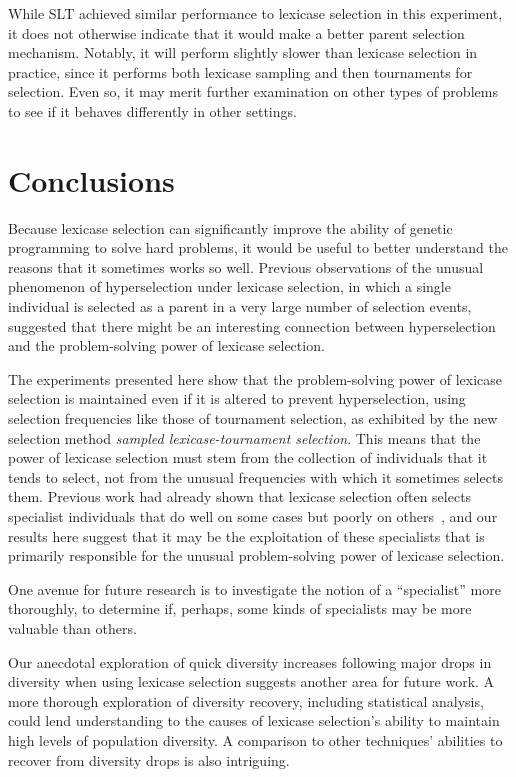 \documentclass{sig-alternate}
\begin{document}
While SLT achieved similar performance to lexicase selection in this experiment, it does not otherwise indicate that it would make a better parent selection mechanism. Notably, it will perform slightly slower than lexicase selection in practice, since it performs both lexicase sampling and then tournaments for selection. Even so, it may merit further examination on other types of problems to see if it behaves differently in other settings.


\section{Conclusions}
\label{section:conclusions}

Because lexicase selection can significantly improve the ability of genetic programming to solve hard problems, it would be useful to better understand the reasons that it sometimes works so well. Previous observations of the unusual phenomenon of hyperselection under lexicase selection, in which a single individual is selected as a parent in a very large number of selection events, suggested that there might be an interesting connection between hyperselection and the problem-solving power of lexicase selection.

The experiments presented here show that the problem-solving power of lexicase selection is maintained even if it is altered to prevent hyperselection, using selection frequencies like those of tournament selection, as exhibited by the new selection method \textit{sampled lexicase-tournament selection}. This means that the power of lexicase selection must stem from the collection of individuals that it tends to select, not from the unusual frequencies with which it sometimes selects them. Previous work had already shown that lexicase selection often selects specialist individuals that do well on some cases but poorly on others~\cite{Helmuth:2015:GPTP,Helmuth:2015:dissertation}, and our results here suggest that it may be the exploitation of these specialists that is primarily responsible for the unusual problem-solving power of lexicase selection.

One avenue for future research is to investigate the notion of a ``specialist'' more thoroughly, to determine if, perhaps, some kinds of specialists may be more valuable than others. 

Our anecdotal exploration of quick diversity increases following major drops in diversity when using lexicase selection suggests another area for future work. A more thorough exploration of diversity recovery, including statistical analysis, could lend understanding to the causes of lexicase selection's ability to maintain high levels of population diversity. A comparison to other techniques' abilities to recover from diversity drops is also intriguing.
\end{document}
